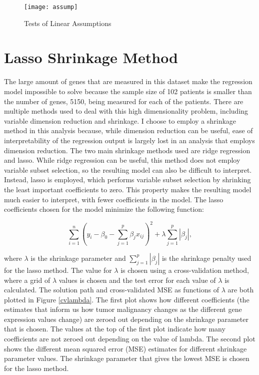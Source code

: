 \documentclass{svproc}
\begin{document}
\begin{figure}
\begin{center}
\caption{Tests of Linear Assumptions}
\texttt{[image: assump]}
\label{assump}
\smallskip
\end{center}
\end{figure}

\section{Lasso Shrinkage Method}

The large amount of genes that are measured in this dataset make the regression model impossible to solve because the sample size of 102 patients is smaller than the number of genes, 5150, being measured for each of the patients. There are multiple methods used to deal with this high dimensionality problem, including variable dimension reduction and shrinkage. I choose to employ a shrinkage method in this analysis because, while dimension reduction can be useful, ease of interpretability of the regression output is largely lost in an analysis that employs dimension reduction. The two main shrinkage methods used are ridge regression and lasso. While ridge regression can be useful, this method does not employ variable subset selection, so the resulting model can also be difficult to interpret. Instead, lasso is employed, which performs variable subset selection by shrinking the least important coefficients to zero. This property makes the resulting model much easier to interpret, with fewer coefficients in the model. The lasso coefficients chosen for the model minimize the following function:

\begin{equation}
\sum_{i=1}^n (y_i - \beta_0 - \sum_{j=1}^p \beta_j x_{ij})^2 + \lambda \sum_{j=1}^p |\beta_j| ,
\end{equation}

where $\lambda$ is the shrinkage parameter and $\sum_{j=1}^p |\beta_j|$ is the shrinkage penalty used for the lasso method. The value for $\lambda$ is chosen using a cross-validation method, where a grid of $\lambda$ values is chosen and the test error for each value of $\lambda$ is calculated. The solution path and cross-validated MSE as functions of $\lambda$ are both plotted in Figure \ref{cvlambda}. The first plot shows how different coefficients (the estimates that inform us how tumor malignancy changes as the different gene expression values change) are zeroed out depending on the shrinkage parameter that is chosen. The values at the top of the first plot indicate how many coefficients are not zeroed out depending on the value of lambda. The second plot shows the different mean squared error (MSE) estimates for different shrinkage parameter values. The shrinkage parameter that gives the lowest MSE is chosen for the lasso method.
\end{document}
